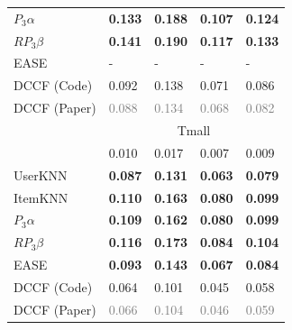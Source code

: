 \documentclass[sigconf,natbib=true,nonacm]{acmart}
\begin{document}
\begin{table}[htbp]
\begin{tabular}{l l l l l }
        $P_{3}\alpha$           & \textbf{0.133}       & \textbf{0.188}            & \textbf{0.107}        & \textbf{0.124}            \\
        $RP_{3}\beta$           & \textbf{0.141}       & \textbf{0.190}            & \textbf{0.117}        &  \textbf{0.133}           \\
        EASE                    &  -                   &    -                     &  -                  &     -        \\
        DCCF  (Code)                  & 0.092	               &   0.138	               & 0.071	               &   0.086                                \\
        DCCF (Paper)                    & \textcolor{gray}{0.088}	               &   \textcolor{gray}{0.134} 	               & \textcolor{gray}{0.068}	               &   \textcolor{gray}{0.082}   \vspace{5pt}                              \\
        \multirow{2}{*}{} & \multicolumn{4}{c}{Tmall} \\ \hline
        TopPop              & 0.010                & 0.017                     & 0.007                 & 0.009            \\
        UserKNN                 & \textbf{0.087}       & \textbf{0.131}            & \textbf{0.063}        & \textbf{0.079}            \\
        ItemKNN                 & \textbf{0.110}       & \textbf{0.163}            & \textbf{0.080}        & \textbf{0.099}            \\
        $P_{3}\alpha$           & \textbf{0.109}       & \textbf{0.162}            & \textbf{0.080}        & \textbf{0.099}            \\
        $RP_{3}\beta$           & \textbf{0.116}       & \textbf{0.173}            & \textbf{0.084}        & \textbf{0.104}           \\
        EASE                    &  \textbf{0.093}      & \textbf{0.143}            & \textbf{0.067}        & \textbf{0.084}            \\
        DCCF  (Code)                  &   0.064	           & 0.101	                   &  0.045	               & 0.058             \\
        DCCF (Paper)            &   \textcolor{gray}{0.066}             & \textcolor{gray}{0.104}	                   &  \textcolor{gray}{0.046}	               & \textcolor{gray}{0.059}             \\ \hline
    \end{tabular}
\end{table}
\end{document}
